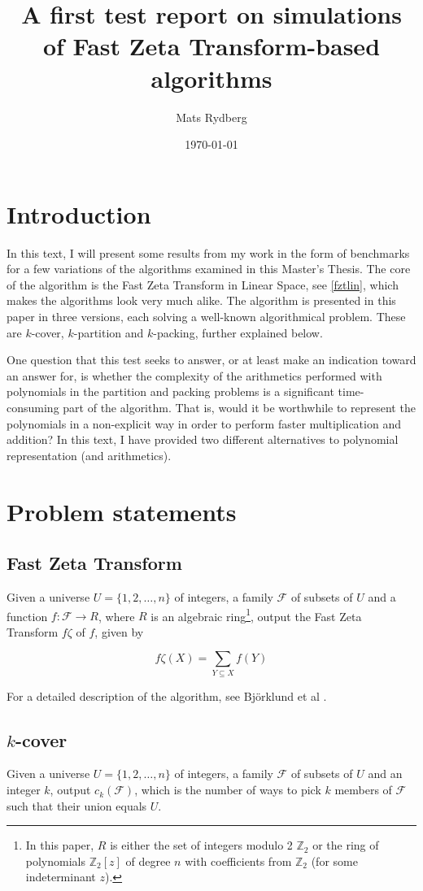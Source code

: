 \documentclass[a4paper, titlepage]{article}
\title{\huge{A first test report on simulations of Fast Zeta Transform-based algorithms}}
\author{Mats Rydberg}
\date{\today}
\begin{document}
\maketitle

\section{Introduction}
In this text, I will present some results from my work in the form of benchmarks for a few variations of the algorithms examined in this Master's Thesis. The core of the algorithm is the Fast Zeta Transform in Linear Space, see \ref{fztlin}, which makes the algorithms look very much alike. The algorithm is presented in this paper in three versions, each solving a well-known algorithmical problem. These are $k$-cover, $k$-partition and $k$-packing, further explained below.

One question that this test seeks to answer, or at least make an indication toward an answer for, is whether the complexity of the arithmetics performed with polynomials in the partition and packing problems is a significant time-consuming part of the algorithm. That is, would it be worthwhile to represent the polynomials in a non-explicit way in order to perform faster multiplication and addition? In this text, I have provided two different alternatives to polynomial representation (and arithmetics).

\section{Problem statements}

\subsection{Fast Zeta Transform}
Given a universe $U = \{1, 2, \ldots, n\}$ of integers, a family $\mathcal{F}$ of subsets of $U$ and a function $f: \mathcal{F} \rightarrow R$, where $R$ is an algebraic ring\footnote{In this paper, $R$ is either the set of integers modulo 2 $\mathbb{Z}_2$ or the ring of polynomials $\mathbb{Z}_2[z]$ of degree $n$ with coefficients from $\mathbb{Z}_2$ (for some indeterminant $z$).}, output the Fast Zeta Transform $f\zeta$ of $f$, given by

$$
f\zeta (X) = \sum_{Y\subseteq X}f(Y)
$$

For a detailed description of the algorithm, see Björklund et al \cite{cov_pack}.

\subsection{$k$-cover}
Given a universe $U = \{1, 2, \ldots, n\}$ of integers, a family $\mathcal{F}$ of subsets of $U$ and an integer $k$, output $c_k(\mathcal{F})$, which is the number of ways to pick $k$ members of $\mathcal{F}$ such that their union equals $U$.
\end{document}
